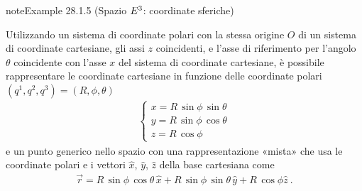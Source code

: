 \documentclass[letterpaper,10pt,italian]{jupyterBook}
\begin{document}
\begin{sphinxadmonition}{note}{Example 28.1.5 (Spazio \protect\(E^3\protect\): coordinate sferiche)}



\sphinxAtStartPar
Utilizzando un sistema di coordinate polari con la stessa origine \(O\) di un sistema di coordinate cartesiane, gli assi \(z\) coincidenti, e l’asse di riferimento per l’angolo \(\theta\) coincidente con l’asse \(x\) del sistema di coordinate cartesiane, è possibile rappresentare le coordinate cartesiane in funzione delle coordinate polari \((q^1, q^2, q^3) = (R, \phi, \theta)\)
\begin{equation*}
\begin{split}\begin{cases}
  x = R \, \sin \phi \, \sin \theta \\
  y = R \, \sin \phi \, \cos \theta \\
  z = R \, \cos \phi
\end{cases}\end{split}
\end{equation*}
\sphinxAtStartPar
e un punto generico nello spazio \sphinxhyphen{} con una rappresentazione «mista» che usa le coordinate polari e i vettori \(\hat{x}\), \(\hat{y}\), \(\hat{z}\) della base cartesiana\sphinxfootnotemark[1] \sphinxhyphen{} come
\begin{equation*}
\begin{split}\vec{r} = R \, \sin \phi \, \cos \theta \, \hat{x} + R \, \sin \phi \, \sin \theta \, \hat{y} + R \, \cos \phi \hat{z} \ .\end{split}
\end{equation*}\end{sphinxadmonition}
\end{document}
